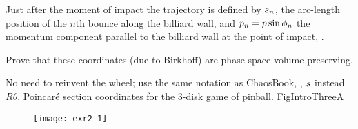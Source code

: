 {Just after
the moment of impact the trajectory  is defined by $s_n$, the arc-length
position of the $n$th bounce along the billiard wall, and
$p_n= p \sin \phi_n$
the momentum component parallel to the billiard wall
at the point of impact,
.

Prove that these coordinates (due to Birkhoff)
are phase space volume
preserving. 

No need to reinvent the wheel; 
use the same notation as ChaosBook, \ie, $s$ instead
$R \theta$. 
%
 {}{ Poincar\'e section coordinates for the
3-disk game of pinball.
    }{FigIntroThreeA}
%
}

\begin{figure}
\centering
\texttt{[image: exr2-1]}
\end{figure}


